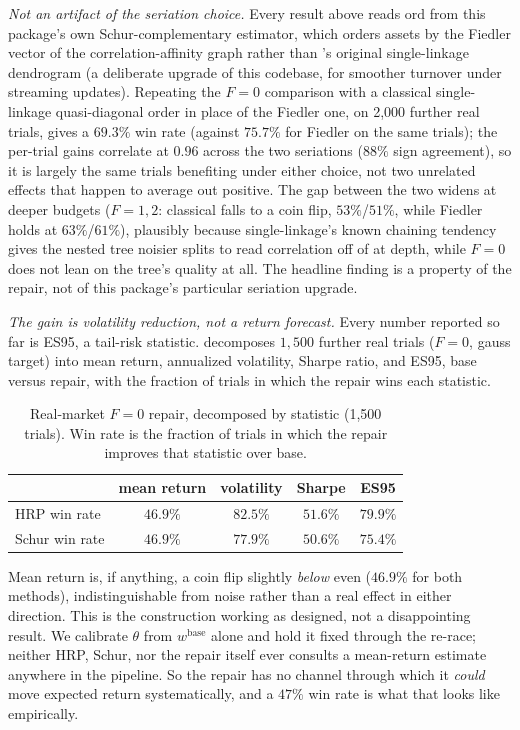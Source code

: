 \documentclass[11pt]{article}
\begin{document}
\emph{Not an artifact of the seriation choice.} Every result above reads
$\mathrm{ord}$ from this package's own Schur-complementary estimator, which
orders assets by the Fiedler vector of the correlation-affinity graph rather
than \textcite{lopezdeprado2016}'s original single-linkage dendrogram (a
deliberate upgrade of this codebase, for smoother turnover under streaming
updates). Repeating the $F=0$ comparison with a classical single-linkage
quasi-diagonal order in place of the Fiedler one, on 2{,}000 further real
trials, gives a $69.3\%$ win rate (against $75.7\%$ for Fiedler on the same
trials); the per-trial gains correlate at $0.96$ across the two seriations
($88\%$ sign agreement), so it is largely the same trials benefiting under
either choice, not two unrelated effects that happen to average out
positive. The gap between the two widens at deeper budgets ($F=1,2$:
classical falls to a coin flip, $53\%$/$51\%$, while Fiedler holds at
$63\%$/$61\%$), plausibly because single-linkage's known chaining tendency
gives the nested tree noisier splits to read correlation off of at depth,
while $F=0$ does not lean on the tree's quality at all. The headline
finding is a property of the repair, not of this package's particular
seriation upgrade.

\emph{The gain is volatility reduction, not a return forecast.} Every
number reported so far is ES95, a tail-risk statistic. 
decomposes $1{,}500$ further real trials ($F=0$, gauss target) into mean
return, annualized volatility, Sharpe ratio, and ES95, base versus repair,
with the fraction of trials in which the repair wins each statistic.

\begin{table}[h]
\centering
\caption{Real-market $F=0$ repair, decomposed by statistic (1{,}500 trials).
Win rate is the fraction of trials in which the repair improves that
statistic over base.}
\label{tab:returnmetrics}
\footnotesize
\begin{tabular}{lcccc}
\toprule
 & mean return & volatility & Sharpe & ES95 \\
\midrule
HRP win rate   & $46.9\%$ & $82.5\%$ & $51.6\%$ & $79.9\%$ \\
Schur win rate & $46.9\%$ & $77.9\%$ & $50.6\%$ & $75.4\%$ \\
\bottomrule
\end{tabular}
\end{table}

Mean return is, if anything, a coin flip slightly \emph{below} even
($46.9\%$ for both methods), indistinguishable from noise rather than a
real effect in either direction. This is the construction working as
designed, not a disappointing result. We calibrate $\theta$ from
$w^{\mathrm{base}}$ alone and hold it fixed through the re-race; neither
HRP, Schur, nor the repair itself ever consults a mean-return estimate
anywhere in the pipeline. So the repair has no channel through which it
\emph{could} move expected return systematically, and a $47\%$ win rate is
what that looks like empirically.
\end{document}
